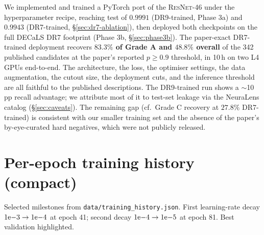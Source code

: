 \documentclass[11pt,letterpaper]{article}
\newcommand{\ResNet}{\textsc{ResNet}}
\begin{document}
We implemented and trained a PyTorch port of the
\textcite{lanusse2018cmu} \ResNet-46 under the
\textcite{huang2020decals} hyperparameter recipe, reaching test \AUC{}
of $0.9991$ (DR9-trained, Phase 3a) and $0.9943$ (DR7-trained,
\S\ref{sec:dr7-ablation}), then deployed both checkpoints on the full
DECaLS DR7 footprint (Phase 3b, \S\ref{sec:phase3b}). The
paper-exact DR7-trained deployment recovers \textbf{$83.3\%$ of
Grade A and $48.8\%$ overall} of the 342 \textcite{huang2020decals}
published candidates at the paper's reported $p \geq 0.9$ threshold,
in 10\,h on two L4 GPUs end-to-end. The architecture, the loss, the
optimiser settings, the data augmentation, the cutout size, the
deployment cuts, and the inference threshold are all faithful to the
published descriptions. The DR9-trained run shows a $\sim$10\,pp
recall advantage; we attribute most of it to test-set leakage via
the NeuraLens catalog (\S\ref{sec:caveats}). The remaining gap
(cf.\ Grade C recovery at $27.8\%$ DR7-trained) is consistent with
our smaller training set and the absence of the paper's by-eye-curated
hard negatives, which were not publicly released.

\appendix
\section{Per-epoch training history (compact)}

Selected milestones from \texttt{data/training\_history.json}.
First learning-rate decay $1{\rm e}{-}3 \to 1{\rm e}{-}4$ at epoch 41;
second decay $1{\rm e}{-}4 \to 1{\rm e}{-}5$ at epoch 81. Best
validation \AUC{} highlighted.
\end{document}
